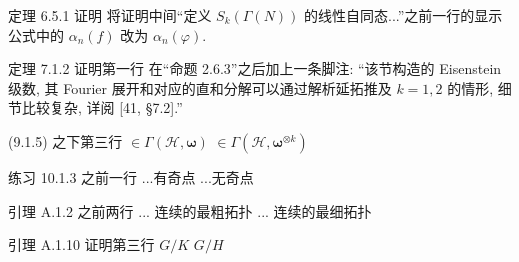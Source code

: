 \documentclass{AJerrata}
\newcommand{\bomega}{\symbf{\omega}}	%
\begin{document}
\begin{Errata}
		\item[定理 6.5.1 证明]
		将证明中间``定义 $S_k(\Gamma(N))$ 的线性自同态...''之前一行的显示公式中的 $\alpha_n(f)$ 改为 $\alpha_n(\varphi)$.
		
		
		\item[定理 7.1.2 证明第一行]
		在``命题 2.6.3''之后加上一条脚注: ``该节构造的 Eisenstein 级数, 其 Fourier 展开和对应的直和分解可以通过解析延拓推及 $k = 1, 2$ 的情形, 细节比较复杂, 详阅 [41, \S 7.2].''
		
		
		\item[(9.1.5) 之下第三行]
		\Orig $\in \Gamma(\mathcal{H}, \bomega)$
		\Corr $\in \Gamma(\mathcal{H}, \bomega^{\otimes k})$
		
		\item[练习 10.1.3 之前一行]
		\Orig ...有奇点
		\Corr ...无奇点
		
		\item[引理 A.1.2 之前两行]
		\Orig ... 连续的最粗拓扑
		\Corr ... 连续的最细拓扑
		
		\item[引理 A.1.10 证明第三行]
		\Orig $G/K$
		\Corr $G/H$
	\end{Errata}
\end{document}
